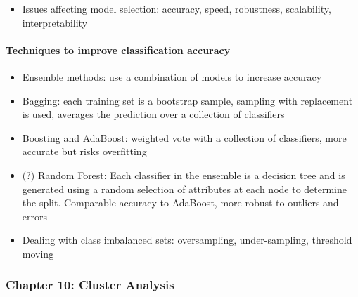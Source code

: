\documentclass[11pt]{article}
\providecommand{\tightlist}{%
      \setlength{\itemsep}{0pt}\setlength{\parskip}{0pt}}
\begin{document}
    \begin{itemize}
\tightlist
\item
  Issues affecting model selection: accuracy, speed, robustness,
  scalability, interpretability
\end{itemize}

    \paragraph{Techniques to improve classification
accuracy}\label{techniques-to-improve-classification-accuracy}

    \begin{itemize}
\tightlist
\item
  Ensemble methods: use a combination of models to increase accuracy
\end{itemize}

    \begin{itemize}
\tightlist
\item
  Bagging: each training set is a bootstrap sample, sampling with
  replacement is used, averages the prediction over a collection of
  classifiers
\item
  Boosting and AdaBoost: weighted vote with a collection of classifiers,
  more accurate but risks overfitting
\item
  (?) Random Forest: Each classifier in the ensemble is a decision tree
  and is generated using a random selection of attributes at each node
  to determine the split. Comparable accuracy to AdaBoost, more robust
  to outliers and errors
\end{itemize}

    \begin{itemize}
\tightlist
\item
  Dealing with class imbalanced sets: oversampling, under-sampling,
  threshold moving
\end{itemize}

    \subsubsection{Chapter 10: Cluster
Analysis}\label{chapter-10-cluster-analysis}
\end{document}
